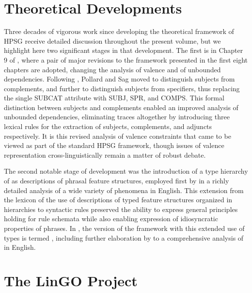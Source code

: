 \documentclass[output=paper]{langsci/langscibook}
\begin{document}
\section{Theoretical Developments}

Three decades of vigorous work since \cite{ps} developing the theoretical framework of HPSG receive detailed discussion throughout the present volume, but we highlight here two significant stages in that development.  The first is in Chapter 9 of \cite{ps2}, where a pair of major revisions to the framework presented in the first eight chapters are adopted, changing the analysis of valence and of unbounded dependencies.  Following \citet{Borsley87,Borsley88b-u,Borsley89,Borsley90a}, Pollard and Sag moved to distinguish subjects from complements, and further to distinguish subjects from specifiers, thus replacing the single SUBCAT attribute with SUBJ, SPR, and COMPS.  This formal distinction between subjects and complements enabled an improved analysis of unbounded dependencies, eliminating traces altogether by introducing three lexical rules for the extraction of subjects, complements, and adjuncts respectively.   It is this revised analysis of valence constraints that came to be viewed as part of the standard HPSG framework, though issues of valence representation cross-linguistically remain a matter of robust debate.

The second notable stage of development was the introduction of a type hierarchy of {\em {}} as descriptions of phrasal feature structures, employed first by \citet{Sag97a} in a richly detailed analysis of a wide variety of  phenomena in English.  This extension from the lexicon of the use of descriptions of typed feature structures organized in hierarchies to syntactic rules preserved the ability to express general principles holding for rule schemata while also enabling expression of idiosyncratic properties of phrases.  In , the version of the framework with this extended use of types is termed {\em {}}, including further elaboration by \citet{GSag2000a-u} to a comprehensive analysis of  in English.  

\section{The LinGO Project}
\end{document}
